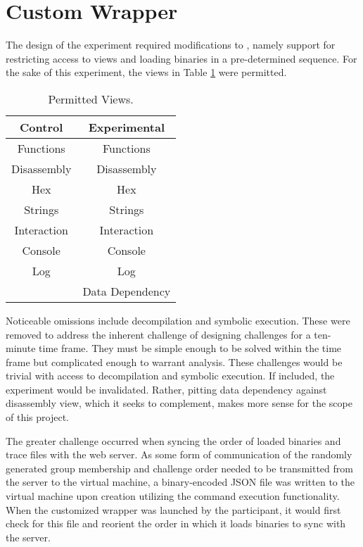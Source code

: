 \section{Custom  Wrapper}
The design of the experiment required modifications to , namely support for restricting access to views and loading binaries in a pre-determined sequence. For the sake of this experiment, the views in Table \ref{table:views} were permitted.
\begin{table}
    \begin{center}
        \caption[Permitted Views]{Permitted Views.}
        \label{table:views}
        \begin{tabular}{ |c|c| }
        \hline
        \textbf{Control} & \textbf{Experimental} \\
        \hline
        Functions & Functions \\
        \hline
        Disassembly & Disassembly \\
        \hline
        Hex & Hex \\
        \hline
        Strings & Strings \\
        \hline
        Interaction & Interaction \\
        \hline
        Console & Console \\
        \hline
        Log & Log \\
        \hline
        & Data Dependency \\
        \hline
        \end{tabular}
    \end{center}
\end{table}
Noticeable omissions include decompilation and symbolic execution. These were removed to address the inherent challenge of designing challenges for a ten-minute time frame. They must be simple enough to be solved within the time frame but complicated enough to warrant analysis. These challenges would be trivial with access to decompilation and symbolic execution. If included, the experiment would be invalidated. Rather, pitting data dependency against disassembly view, which it seeks to complement, makes more sense for the scope of this project. 

The greater challenge occurred when syncing the order of loaded binaries and trace files with the web server. As some form of communication of the randomly generated group membership and challenge order needed to be transmitted from the server to the virtual machine, a binary-encoded JSON file was written to the virtual machine upon creation utilizing the  command execution functionality. When the customized  wrapper was launched by the participant, it would first check for this file and reorient the order in which it loads binaries to sync with the server.

